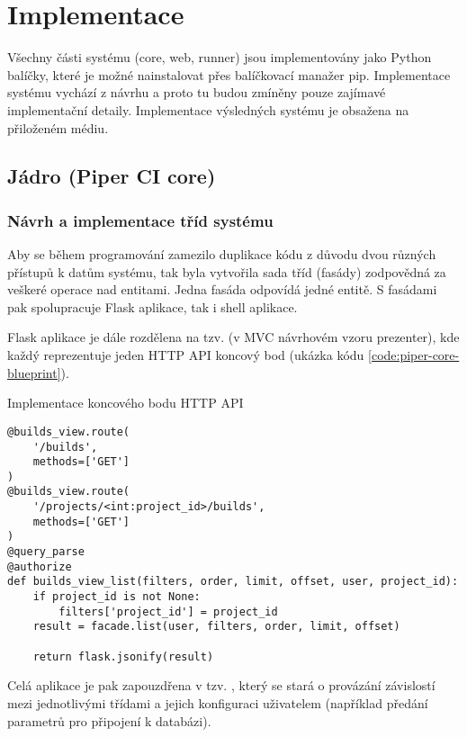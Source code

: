 \chapter{Implementace}

Všechny části systému (core, web, runner) jsou implementovány jako Python balíčky, které je možné nainstalovat přes balíčkovací manažer pip.
Implementace systému vychází z návrhu a proto tu budou zmíněny pouze zajímavé implementační detaily.
Implementace výsledných systému je obsažena na přiloženém médiu.

\section{Jádro (Piper CI core)}

\subsection{Návrh a implementace tříd systému}


Aby se během programování zamezilo duplikace kódu z důvodu dvou různých přístupů k datům systému, tak byla vytvořila sada tříd (fasády) zodpovědná za veškeré operace nad entitami.
Jedna fasáda odpovídá jedné entitě.
S fasádami pak spolupracuje Flask aplikace, tak i shell aplikace.

Flask aplikace je dále rozdělena na tzv.  (v MVC návrhovém vzoru prezenter), kde každý reprezentuje jeden HTTP API koncový bod (ukázka kódu \ref{code:piper-core-blueprint}).

\begin{listing}[ht]
\caption{\label{code:piper-core-blueprint}Implementace koncového bodu HTTP API}
\begin{verbatim}
@builds_view.route(
    '/builds',
    methods=['GET']
)
@builds_view.route(
    '/projects/<int:project_id>/builds',
    methods=['GET']
)
@query_parse
@authorize
def builds_view_list(filters, order, limit, offset, user, project_id):
    if project_id is not None:
        filters['project_id'] = project_id
    result = facade.list(user, filters, order, limit, offset)

    return flask.jsonify(result)
\end{verbatim}
\end{listing}

Celá aplikace je pak zapouzdřena v tzv. , který se stará o provázání závislostí mezi jednotlivými třídami a jejich konfiguraci uživatelem (například předání parametrů pro připojení k databázi).

